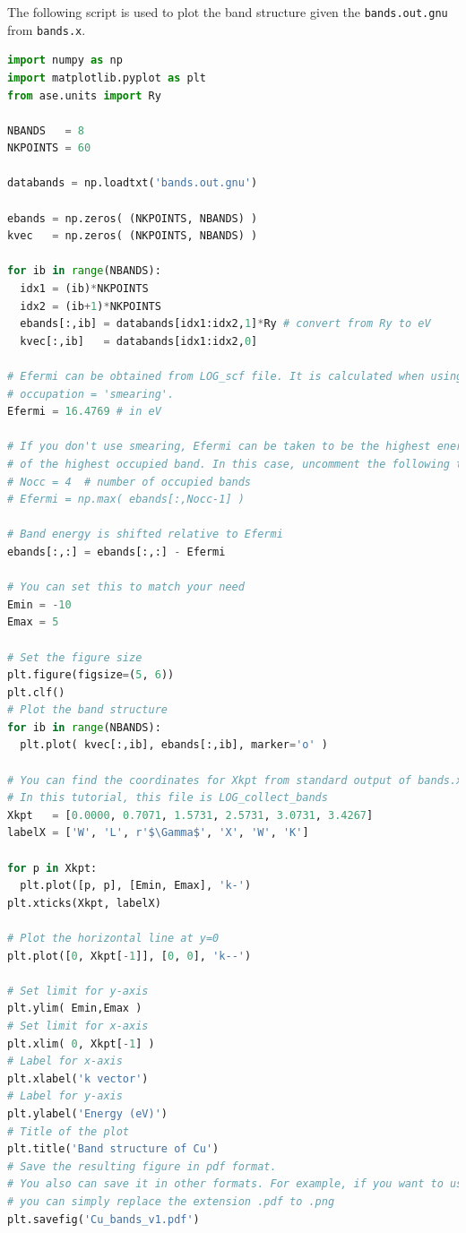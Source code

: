 \documentclass[12pt,english]{paper}
\begin{document}
The following script is used to plot the band structure given the
\texttt{bands.out.gnu} from \texttt{bands.x}.

\begin{lstlisting}[language=Python,tabsize=2]
import numpy as np
import matplotlib.pyplot as plt
from ase.units import Ry

NBANDS   = 8
NKPOINTS = 60

databands = np.loadtxt('bands.out.gnu')

ebands = np.zeros( (NKPOINTS, NBANDS) )
kvec   = np.zeros( (NKPOINTS, NBANDS) )

for ib in range(NBANDS):
  idx1 = (ib)*NKPOINTS
  idx2 = (ib+1)*NKPOINTS
  ebands[:,ib] = databands[idx1:idx2,1]*Ry # convert from Ry to eV
  kvec[:,ib]   = databands[idx1:idx2,0]

# Efermi can be obtained from LOG_scf file. It is calculated when using
# occupation = 'smearing'.
Efermi = 16.4769 # in eV

# If you don't use smearing, Efermi can be taken to be the highest energy
# of the highest occupied band. In this case, uncomment the following two lines
# Nocc = 4  # number of occupied bands
# Efermi = np.max( ebands[:,Nocc-1] )

# Band energy is shifted relative to Efermi
ebands[:,:] = ebands[:,:] - Efermi

# You can set this to match your need
Emin = -10
Emax = 5

# Set the figure size
plt.figure(figsize=(5, 6))
plt.clf()
# Plot the band structure
for ib in range(NBANDS):
  plt.plot( kvec[:,ib], ebands[:,ib], marker='o' )

# You can find the coordinates for Xkpt from standard output of bands.x
# In this tutorial, this file is LOG_collect_bands
Xkpt   = [0.0000, 0.7071, 1.5731, 2.5731, 3.0731, 3.4267]
labelX = ['W', 'L', r'$\Gamma$', 'X', 'W', 'K']

for p in Xkpt:
  plt.plot([p, p], [Emin, Emax], 'k-')
plt.xticks(Xkpt, labelX)

# Plot the horizontal line at y=0
plt.plot([0, Xkpt[-1]], [0, 0], 'k--')

# Set limit for y-axis
plt.ylim( Emin,Emax )
# Set limit for x-axis
plt.xlim( 0, Xkpt[-1] )
# Label for x-axis
plt.xlabel('k vector')
# Label for y-axis
plt.ylabel('Energy (eV)')
# Title of the plot
plt.title('Band structure of Cu')
# Save the resulting figure in pdf format.
# You also can save it in other formats. For example, if you want to use PNG file
# you can simply replace the extension .pdf to .png
plt.savefig('Cu_bands_v1.pdf')
\end{lstlisting}
\end{document}
